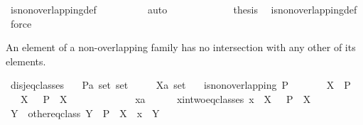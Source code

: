 \begin{isabellebody}
\ is{\isacharunderscore}non{\isacharunderscore}overlapping{\isacharunderscore}def\isanewline
\ \ \ \ \ \ \ \ \isamarkupfalse%
\ auto\isanewline
\ \ \ \ \isamarkupfalse%
\isanewline
\ \ \isacommand{{\isacharbraceright}}\isamarkupfalse%
\isanewline
\ \ \isamarkupfalse%
\ \isamarkupfalse%
\ {\isacharquery}thesis\ \isamarkupfalse%
\ is{\isacharunderscore}non{\isacharunderscore}overlapping{\isacharunderscore}def\ \isamarkupfalse%
\ force\isanewline
{}\isamarkupfalse%
%
\endisatagproof
{\isafoldproof}%
%
\isadelimproof
%
\endisadelimproof
%
\begin{isamarkuptext}%
An element of a non-overlapping family has no intersection with any other of its elements.%
\end{isamarkuptext}%
\isamarkuptrue%
\isamarkupfalse%
\ disj{\isacharunderscore}eq{\isacharunderscore}classes{\isacharcolon}\isanewline
\ \ \ P{\isacharcolon}{\isacharcolon}{\isachardoublequoteopen}{\isacharprime}a\ set\ set{\isachardoublequoteclose}\isanewline
\ \ \ \ \ X{\isacharcolon}{\isacharcolon}{\isachardoublequoteopen}{\isacharprime}a\ set{\isachardoublequoteclose}\isanewline
\ \ \ {\isachardoublequoteopen}is{\isacharunderscore}non{\isacharunderscore}overlapping\ P{\isachardoublequoteclose}\isanewline
\ \ \ \ \ \ \ {\isachardoublequoteopen}X\ {\isasymin}\ P{\isachardoublequoteclose}\isanewline
\ \ \ {\isachardoublequoteopen}X\ {\isasyminter}\ {\isasymUnion}\ {\isacharparenleft}P\ {\isacharminus}\ {\isacharbraceleft}X{\isacharbraceright}{\isacharparenright}\ {\isacharequal}\ {\isacharbraceleft}{\isacharbraceright}{\isachardoublequoteclose}\ \isanewline
%
\isadelimproof
%
\endisadelimproof
%
\isatagproof
{}\isamarkupfalse%
\ {\isacharminus}\isanewline
\ \ \isacommand{{\isacharbraceleft}}\isamarkupfalse%
\isanewline
\ \ \ \ \isamarkupfalse%
\ x{\isacharcolon}{\isacharcolon}{\isacharprime}a\isanewline
\ \ \ \ \isamarkupfalse%
\ x{\isacharunderscore}in{\isacharunderscore}two{\isacharunderscore}eq{\isacharunderscore}classes{\isacharcolon}\ {\isachardoublequoteopen}x\ {\isasymin}\ X\ {\isasyminter}\ {\isasymUnion}\ {\isacharparenleft}P\ {\isacharminus}\ {\isacharbraceleft}X{\isacharbraceright}{\isacharparenright}{\isachardoublequoteclose}\isanewline
\ \ \ \ \isamarkupfalse%
\ \isamarkupfalse%
\ Y\ \ other{\isacharunderscore}eq{\isacharunderscore}class{\isacharcolon}\ {\isachardoublequoteopen}Y\ {\isasymin}\ P\ {\isacharminus}\ {\isacharbraceleft}X{\isacharbraceright}\ {\isasymand}\ x\ {\isasymin}\ Y{\isachardoublequoteclose}\ \isamarkupfalse%

\end{isabellebody}
